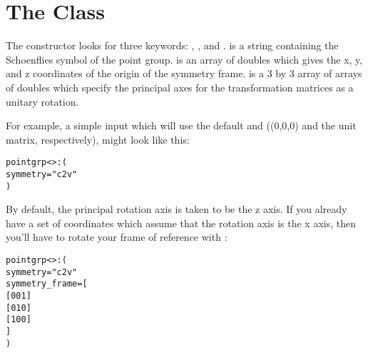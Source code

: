 
\section{The  Class}\label{PointGroup}

The   constructor looks
for three keywords: ,
, and
.  is a string containing the
Schoenflies symbol of the point group.   is an
array of doubles which gives the x, y, and z coordinates of
the origin of the symmetry frame.  
is a 3 by 3 array of arrays of doubles which specify the
principal axes for the transformation matrices as a unitary
rotation.

For example, a simple input which will use the default
 and  ((0,0,0) and the
unit matrix, respectively), might look like this:

\begin{alltt}
pointgrp<>: (
  symmetry = "c2v"
)
\end{alltt}

By default, the principal rotation axis is taken to be the z
axis.  If you already have a set of coordinates which assume
that the rotation axis is the x axis, then you'll have to
rotate your frame of reference with :

\begin{alltt}
pointgrp<>: (
  symmetry = "c2v"
  symmetry_frame = [
    [ 0 0 1 ]
    [ 0 1 0 ]
    [ 1 0 0 ]
  ]
)
\end{alltt}
